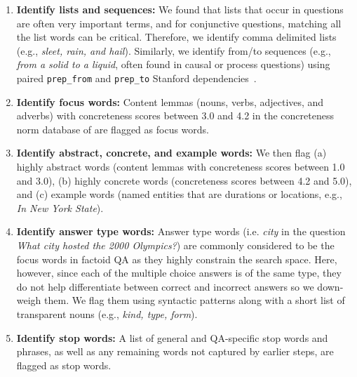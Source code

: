 \begin{enumerate}

\item {\bf Identify lists and sequences:} We found that lists that occur in questions are often very important terms, and for conjunctive questions, matching all the list words can be critical.  Therefore, we identify comma delimited lists (e.g., {\em sleet, rain, and hail}). Similarly, we identify from/to sequences (e.g., {\em from a solid to a liquid}, often found in causal or process questions) using paired {\tt prep\_from} and {\tt prep\_to} Stanford dependencies~\citep{de2008stanford}. 

\item {\bf Identify focus words:} Content lemmas (nouns, verbs, adjectives, and adverbs) with concreteness scores between 3.0 and 4.2 in the concreteness norm database of \citet{brysbaert:2014} are flagged as focus words. 

\item {\bf Identify abstract, concrete, and example words:} We then flag (a) highly abstract words (content lemmas with concreteness scores between 1.0 and 3.0), (b) highly concrete words (concreteness scores between 4.2 and 5.0), and (c) example words (named entities that are durations or locations, e.g., {\em In New York State}).  

\item {\bf Identify answer type words:} Answer type words (i.e.  \textit{city} in the question \textit{What city hosted the 2000 Olympics?}) are commonly considered to be the focus words in factoid QA as they highly constrain the search space.  Here, however, since each of the multiple choice answers is of the same type, they do not help differentiate between correct and incorrect answers so we down-weigh them.  We flag them using syntactic patterns along with a short list of transparent nouns (e.g., {\em kind, type, form}).

\item {\bf Identify stop words: } A list of general and QA-specific stop words and phrases, as well as any remaining words not captured by earlier steps, are flagged as stop words.

\end{enumerate}


